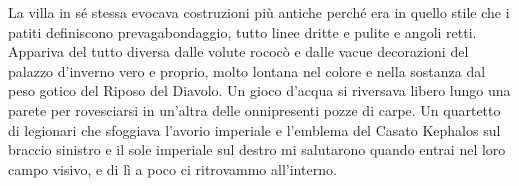 La villa in sé stessa evocava costruzioni più antiche perché era in
quello stile che i patiti definiscono prevagabondaggio, tutto linee
dritte e pulite e angoli retti. Appariva del tutto diversa dalle volute
rococò e dalle vacue decorazioni del palazzo d'inverno vero e proprio,
molto lontana nel colore e nella sostanza dal peso gotico del Riposo del
Diavolo. Un gioco d'acqua si riversava libero lungo una parete per
rovesciarsi in un'altra delle onnipresenti pozze di carpe. Un quartetto
di legionari che sfoggiava l'avorio imperiale e l'emblema del Casato
Kephalos sul braccio sinistro e il sole imperiale sul destro mi
salutarono quando entrai nel loro campo visivo, e di lì a poco ci
ritrovammo all'interno.


